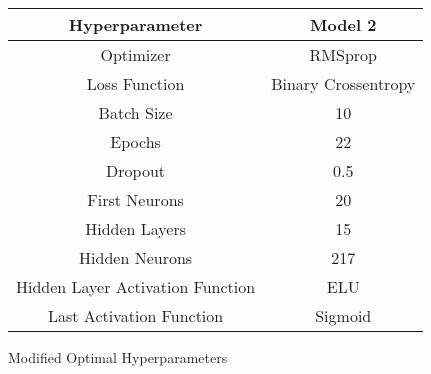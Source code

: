 \begin{tabular}{|c|c|}
    \hline
    Hyperparameter & Model 2\\
    \hline
    \hline
    Optimizer & RMSprop\\
    \hline
    Loss Function & Binary Crossentropy\\
    \hline
    Batch Size & 10\\
    \hline
    Epochs & 22\\
    \hline
    Dropout & 0.5\\
    \hline
    First Neurons & 20\\
    \hline
    Hidden Layers & 15\\
    \hline
    Hidden Neurons & 217\\
    \hline
    Hidden Layer Activation Function & ELU\\
    \hline
    Last Activation Function & Sigmoid\\
    \hline
\end{tabular}
\caption{Modified Optimal Hyperparameters}
\label{tab: Modified Optimal Hyperparameters uart}